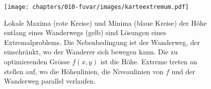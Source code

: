 %
%
%
\begin{figure}
\centering
\texttt{[image: chapters/010-fuvar/images/karteextremum.pdf]}
\caption{Lokale Maxima ({\color{darkred}rote} Kreise) und Minima
({\color{blue}blaue} Kreise) der Höhe entlang eines Wanderwegs
({\color{gelb}gelb}) sind Lösungen eines Extremalproblems.
Die Nebenbedingung ist der Wanderweg, der einschränkt, wo der Wanderer
sich bewegen kann.
Die zu optimierenden Grösse $f(x,y)$ ist die Höhe.
Extreme treten an stellen auf, wo die Höhenlinien, die Niveaulinien 
von $f$ und der Wanderweg parallel verlaufen.
\label{buch:fuvar:nebenbedingung:fig:karte}}
\end{figure}
